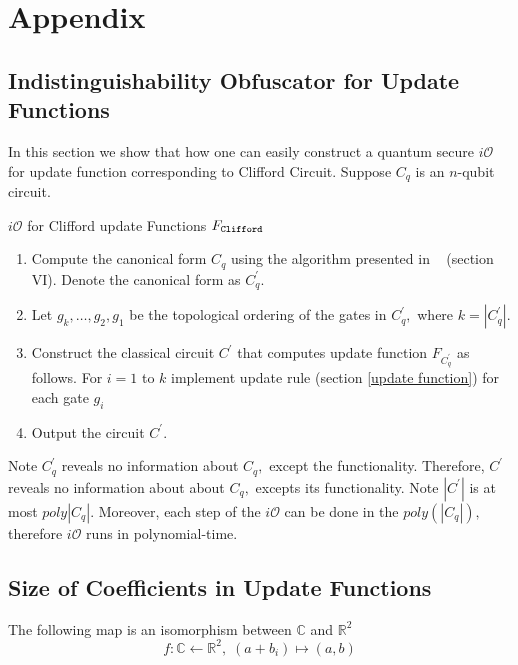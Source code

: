 \section{Appendix}
\label{sec:appendix}
 \subsection{Indistinguishability Obfuscator for Update Functions}
 \label{sec: iO-clifford-functions}
 In this section we show that how one can easily construct a quantum secure $i\mathcal{O}$ for update function corresponding to Clifford Circuit. Suppose $C_q$ is an $n$-qubit circuit.
\begin{algorithm}[H]
  \caption{$i\mathcal{O}$ for Clifford update Functions $F_{\tt Clifford}$}
  \begin{enumerate}
  \item Compute the canonical form $C_q$ using the algorithm presented in ~\cite{AG04} (section VI). Denote the canonical form as $C_q^\prime.$
  \item Let $g_k, \ldots,g_2,g_1$ be the topological ordering of the gates in $C_q^\prime,$ where $k=|C_q^\prime|.$
  \item Construct the classical circuit $C^\prime$ that computes update function $F_{C_q^\prime}$ as follows. For $i=1$ to $k$ implement update rule (section \ref{update function})  for each gate $g_i$
  \item Output the circuit $C^\prime.$
  \end{enumerate}
\end{algorithm}
%
\noindent Note $C_q^\prime$ reveals no information about $C_q,$ except the functionality. Therefore, $C^\prime$ reveals no information about about $C_q,$ excepts its functionality. Note $|C^\prime|$ is at most $poly|C_q|.$ Moreover, each step of the $i\mathcal{O}$ can be done in the $poly(|C_q|),$ therefore $i\mathcal{O}$ runs in polynomial-time.



 \subsection{Size of Coefficients in Update Functions}
 \label{coeff:size}
The following map is an isomorphism between $\mathbb{C}$ and $\mathbb{R}^2$
 \begin{equation}
  \label{size:map:real-complex)}
  f:\mathbb{C}\leftarrow \mathbb{R}^2, \; (a+b_i)\mapsto (a,b)
\end{equation}

